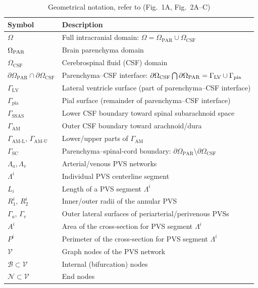 \documentclass[fleqn,10pt]{wlscirep}
\begin{document}
\begin{table}[h!] 
\centering
\begin{tabular}{ll}
\toprule
\textbf{Symbol} & \textbf{Description} \\
\midrule
$\Omega$ & Full intracranial domain: $\Omega = \Omega_{\mathrm{PAR}} \cup \Omega_{\mathrm{CSF}}$ \\
$\Omega_{\rm PAR}$ & Brain parenchyma domain \\
$\Omega_{\mathrm{CSF}}$ & Cerebrospinal fluid (CSF) domain \\
$\partial\Omega_{\mathrm{PAR}}\cap\partial\Omega_{\mathrm{CSF}}$ & Parenchyma–CSF interface: $\partial \Omega_{\rm CSF} \bigcap \partial
\Omega_{\rm PAR} = \Gamma_{\rm LV} \cup \Gamma_{\rm pia}$ \\
$\Gamma_{\mathrm{LV}}$ & Lateral ventricle surface (part of parenchyma–CSF interface) \\
$\Gamma_{\mathrm{pia}}$ & Pial surface (remainder of parenchyma–CSF interface) \\
$\Gamma_{\mathrm{SSAS}}$ & Lower CSF boundary toward spinal subarachnoid space \\
$\Gamma_{\mathrm{AM}}$ & Outer CSF boundary toward arachnoid/dura \\
$\Gamma_{\mathrm{AM\text{-}L}}$, $\Gamma_{\mathrm{AM\text{-}U}}$ & Lower/upper parts of $\Gamma_{\mathrm{AM}}$ \\
$\Gamma_{\mathrm{SC}}$ & Parenchyma–spinal‐cord boundary: $\partial\Omega_{\mathrm{PAR}}\setminus\partial\Omega_{\mathrm{CSF}}$ \\
$\Lambda_{a},\Lambda_{v}$ & Arterial/venous PVS networks \\
$\Lambda^{i}$ & Individual PVS centerline segment \\
$L_i$ & Length of a PVS segment $\Lambda^i$ \\
$R_{1}^{i},\,R_{2}^{i}$ & Inner/outer radii of the annular PVS \\
$\Gamma_{a},\,\Gamma_{v}$ & Outer lateral surfaces of periarterial/perivenous PVSs \\
$A^i$ & Area of the cross‐section for PVS segment $\Lambda^i$ \\
$P^i$ & Perimeter of the cross‐section for PVS segment $\Lambda^i$ \\
$\mathcal V$ & Graph nodes of the PVS network \\
$\mathcal B\subset  \mathcal V$ & Internal (bifurcation) nodes \\
$\mathcal N\subset  \mathcal V$ & End nodes \\
\bottomrule
\end{tabular}
\caption{Geometrical notation, refer to (Fig.~1A, Fig.~2A--C)}
\label{table:geometry_notation}
\end{table}
\end{document}
